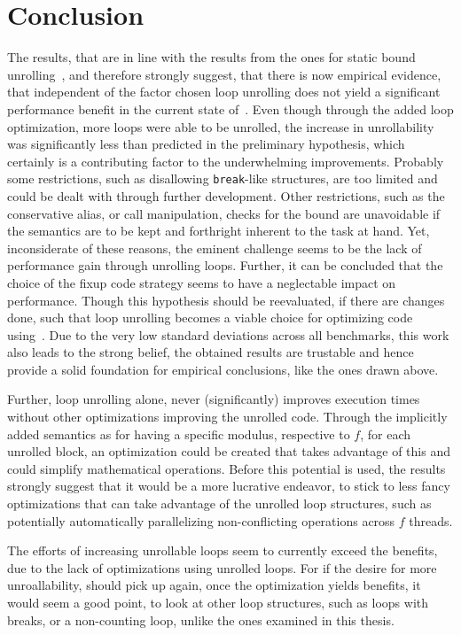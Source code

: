 \chapter{Conclusion}\label{sec:conclusion}

The results, that are in line with the results from the ones for static bound unrolling~\cite{aebi18bachelorarbeit}, and therefore strongly suggest, that there is now empirical evidence, that independent of the factor chosen loop unrolling does not yield a significant performance benefit in the current state of~\libFIRM.
Even though through the added loop optimization, more loops were able to be unrolled, the increase in unrollability was significantly less than predicted in the preliminary hypothesis, which certainly is a contributing factor to the underwhelming improvements.
Probably some restrictions, such as disallowing \texttt{break}-like structures, are too limited and could be dealt with through further development.
Other restrictions, such as the conservative alias, or call manipulation, checks for the bound are unavoidable if the semantics are to be kept and forthright inherent to the task at hand.
Yet, inconsiderate of these reasons, the eminent challenge seems to be the lack of performance gain through unrolling loops.
Further, it can be concluded that the choice of the fixup code strategy seems to have a neglectable impact on performance.
Though this hypothesis should be reevaluated, if there are changes done, such that loop unrolling becomes a viable choice for optimizing code using~\libFIRM.
Due to the very low standard deviations across all benchmarks, this work also leads to the strong belief, the obtained results are trustable and hence provide a solid foundation for empirical conclusions, like the ones drawn above.

Further, loop unrolling alone, never (significantly) improves execution times without other optimizations improving the unrolled code.
Through the implicitly added semantics as for having a specific modulus, respective to $f$, for each unrolled block, an optimization could be created that takes advantage of this and could simplify mathematical operations.
Before this potential is used, the results strongly suggest that it would be a more lucrative endeavor, to stick to less fancy optimizations that can take advantage of the unrolled loop structures, such as potentially automatically parallelizing non-conflicting operations across $f$ threads. %

The efforts of increasing unrollable loops seem to currently exceed the benefits, due to the lack of optimizations using unrolled loops.
For if the desire for more unroallability, should pick up again, once the optimization yields benefits, it would seem a good point, to look at other loop structures, such as loops with breaks, or a non-counting loop, unlike the ones examined in this thesis.
